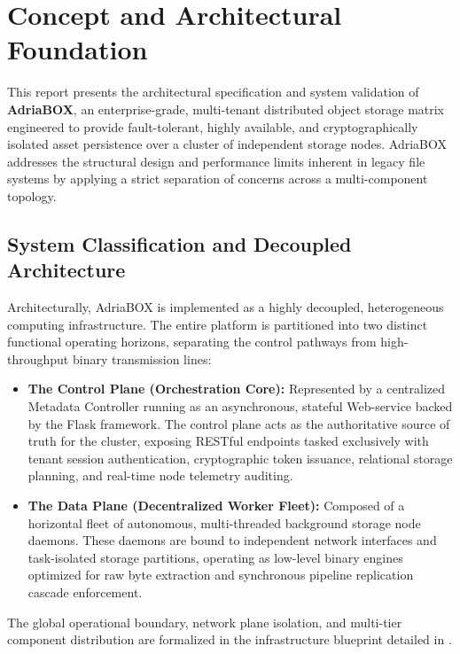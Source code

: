 \section{Concept and Architectural Foundation}
\label{sec:concept}

This report presents the architectural specification and system validation of \textbf{AdriaBOX}, an enterprise-grade, multi-tenant distributed object storage matrix engineered to provide fault-tolerant, highly available, and cryptographically isolated asset persistence over a cluster of independent storage nodes. AdriaBOX addresses the structural design and performance limits inherent in legacy file systems by applying a strict separation of concerns across a multi-component topology.

\subsection{System Classification and Decoupled Architecture}
Architecturally, AdriaBOX is implemented as a highly decoupled, heterogeneous computing infrastructure. The entire platform is partitioned into two distinct functional operating horizons, separating the control pathways from high-throughput binary transmission lines:
\begin{itemize}
    \item \textbf{The Control Plane (Orchestration Core):} Represented by a centralized Metadata Controller running as an asynchronous, stateful Web-service backed by the Flask framework. The control plane acts as the authoritative source of truth for the cluster, exposing RESTful endpoints tasked exclusively with tenant session authentication, cryptographic token issuance, relational storage planning, and real-time node telemetry auditing.
    \item \textbf{The Data Plane (Decentralized Worker Fleet):} Composed of a horizontal fleet of autonomous, multi-threaded background storage node daemons. These daemons are bound to independent network interfaces and task-isolated storage partitions, operating as low-level binary engines optimized for raw byte extraction and synchronous pipeline replication cascade enforcement.
\end{itemize}

The global operational boundary, network plane isolation, and multi-tier component distribution are formalized in the infrastructure blueprint detailed in .

